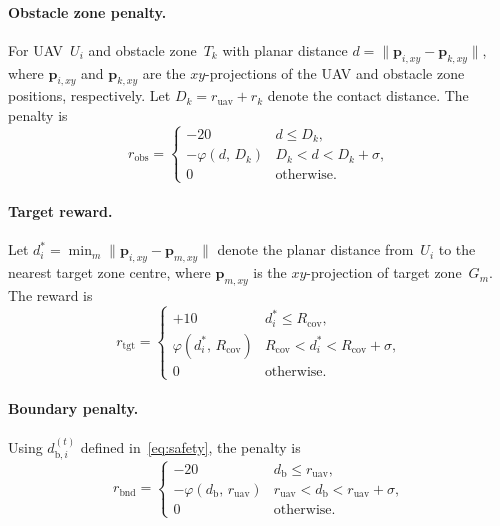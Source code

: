 \paragraph{Obstacle zone penalty.}
For UAV~$U_i$ and obstacle zone~$T_k$ with planar distance
$d = \lVert\mathbf{p}_{i,xy} - \mathbf{p}_{k,xy}\rVert$, where
$\mathbf{p}_{i,xy}$ and $\mathbf{p}_{k,xy}$ are the $xy$-projections of the
UAV and obstacle zone positions, respectively.
Let $D_k = r_{\mathrm{uav}} + r_k$ denote the contact distance.
The penalty is
\begin{equation}
  r_{\mathrm{obs}} =
  \begin{cases}
    -20 & d \le D_k, \\[3pt]
    -\varphi(d,\, D_k)
    & D_k < d < D_k + \sigma, \\[3pt]
    0 & \text{otherwise}.
  \end{cases}
  \label{eq:r_obs}
\end{equation}

\paragraph{Target reward.}
Let $d_i^{*} = \min_{m} \lVert\mathbf{p}_{i,xy} - \mathbf{p}_{m,xy}\rVert$
denote the planar distance from~$U_i$ to the nearest target zone centre,
where $\mathbf{p}_{m,xy}$ is the $xy$-projection of target zone~$G_m$.
The reward is
\begin{equation}
  r_{\mathrm{tgt}} =
  \begin{cases}
    +10
    & d_i^{*} \le R_{\mathrm{cov}}, \\[3pt]
    \varphi(d_i^{*},\, R_{\mathrm{cov}})
    & R_{\mathrm{cov}} < d_i^{*} < R_{\mathrm{cov}} + \sigma, \\[3pt]
    0 & \text{otherwise}.
  \end{cases}
  \label{eq:r_tgt}
\end{equation}

\paragraph{Boundary penalty.}
Using $d_{\mathrm{b},i}^{(t)}$ defined in~\eqref{eq:safety}, the penalty is
\begin{equation}
  r_{\mathrm{bnd}} =
  \begin{cases}
    -20 & d_{\mathrm{b}} \le r_{\mathrm{uav}}, \\[3pt]
    -\varphi(d_{\mathrm{b}},\, r_{\mathrm{uav}})
    & r_{\mathrm{uav}} < d_{\mathrm{b}} < r_{\mathrm{uav}} + \sigma, \\[3pt]
    0 & \text{otherwise}.
  \end{cases}
  \label{eq:r_bnd}
\end{equation}


